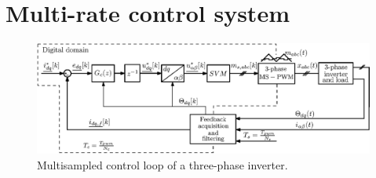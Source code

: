\documentclass[journal]{IEEEtran}
\begin{document}
 
\section{Multi-rate control system}

\begin{figure}[t!]
    \centerline{\includegraphics[width=0.8\linewidth]{figures/schematic.eps}}
    \caption{Multisampled control loop of a three-phase inverter.}
    \label{fig:MSControl}
\end{figure}
\end{document}
